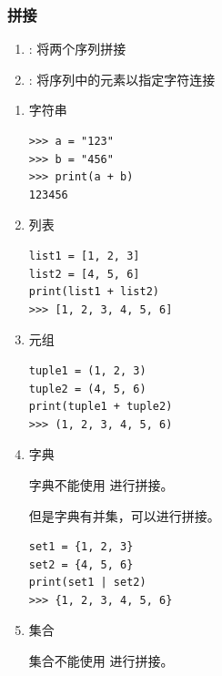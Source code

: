 \subsubsection{拼接}
\begin{enumerate}[label=\arabic*)]
    \item \codeinline{+}: 将两个序列拼接
    \item {}: 将序列中的元素以指定字符连接
\end{enumerate}
\begin{enumerate}[label=\arabic*)]
    \item 字符串
\begin{lstlisting}[style=demostyle,numbers=none]
>>> a = "123"
>>> b = "456"
>>> print(a + b)
123456
\end{lstlisting}

    \item 列表
\begin{lstlisting}[style=demostyle,numbers=none]
list1 = [1, 2, 3]
list2 = [4, 5, 6]
print(list1 + list2)
>>> [1, 2, 3, 4, 5, 6] 
\end{lstlisting}

    \item 元组
\begin{lstlisting}[style=demostyle,numbers=none]
tuple1 = (1, 2, 3)
tuple2 = (4, 5, 6)
print(tuple1 + tuple2)
>>> (1, 2, 3, 4, 5, 6)
\end{lstlisting}

    \item 字典

    字典不能使用 \codeinline{+} 进行拼接。

    但是字典有\codeinline{|}并集，可以进行拼接。
\begin{lstlisting}[style=demostyle,numbers=none]
set1 = {1, 2, 3}
set2 = {4, 5, 6}
print(set1 | set2)
>>> {1, 2, 3, 4, 5, 6}
\end{lstlisting}

    \item 集合

    集合不能使用 \codeinline{+} 进行拼接。
\end{enumerate}


